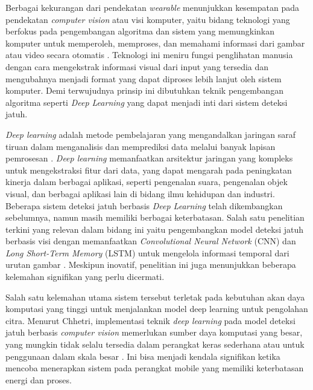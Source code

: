 Berbagai kekurangan dari pendekatan \textit{wearable} menunjukkan kesempatan pada pendekatan \textit{computer vision} atau visi komputer, yaitu bidang teknologi yang berfokus pada pengembangan algoritma dan sistem yang memungkinkan komputer untuk memperoleh, memproses, dan memahami informasi dari gambar atau video secara otomatis \cite{Negoro2023}. Teknologi ini meniru fungsi penglihatan manusia dengan cara mengekstrak informasi visual dari input yang tersedia dan mengubahnya menjadi format yang dapat diproses lebih lanjut oleh sistem komputer. Demi terwujudnya prinsip ini dibutuhkan teknik pengembangan algoritma seperti \textit{Deep Learning} yang dapat menjadi inti dari sistem deteksi jatuh.

\textit{Deep learning} adalah metode pembelajaran yang mengandalkan jaringan saraf tiruan dalam menganalisis dan memprediksi data melalui banyak lapisan pemrosesan \cite{LeCun2015}. \textit{Deep learning} memanfaatkan arsitektur jaringan yang kompleks untuk mengekstraksi fitur dari data, yang dapat mengarah pada peningkatan kinerja dalam berbagai aplikasi, seperti pengenalan suara, pengenalan objek visual, dan berbagai aplikasi lain di bidang ilmu kehidupan dan industri. Beberapa sistem deteksi jatuh berbasis \textit{Deep Learning} telah dikembangkan sebelumnya, namun masih memiliki berbagai keterbatasan. Salah satu penelitian terkini yang relevan dalam bidang ini yaitu pengembangkan model deteksi jatuh berbasis visi dengan memanfaatkan \textit{Convolutional Neural Network} (CNN) dan \textit{Long Short-Term Memory} (LSTM) untuk mengelola informasi temporal dari urutan gambar \cite{Chhetri2021}. Meskipun inovatif, penelitian ini juga menunjukkan beberapa kelemahan signifikan yang perlu dicermati. 

Salah satu kelemahan utama sistem tersebut terletak pada kebutuhan akan daya komputasi yang tinggi untuk menjalankan model deep learning untuk pengolahan citra. Menurut Chhetri, implementasi teknik \textit{deep learning} pada model deteksi jatuh berbasis \textit{computer vision} memerlukan sumber daya komputasi yang besar, yang mungkin tidak selalu tersedia dalam perangkat keras sederhana atau untuk penggunaan dalam skala besar \cite{Chhetri2021}. Ini bisa menjadi kendala signifikan ketika mencoba menerapkan sistem pada perangkat mobile yang memiliki keterbatasan energi dan proses. \par

